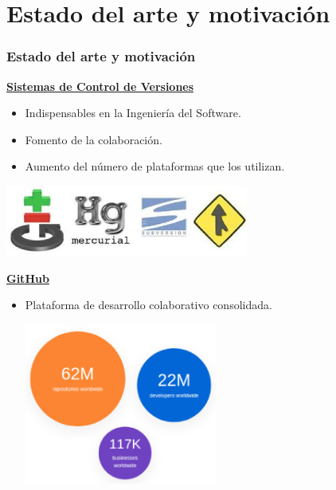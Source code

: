 \documentclass{beamer}
\begin{document}
\section{Estado del arte y motivación}
\begin{frame}[allowframebreaks]
	\frametitle{Estado del arte y motivación}
	
	\underline{{\bfseries Sistemas de Control de Versiones}}
	\bigskip
	
	\begin{itemize}
       \item Indispensables en la Ingeniería del Software.
	   \item Fomento de la colaboración.	
	   \item Aumento del número de plataformas que los utilizan.  
	\end{itemize}
	\bigskip
	
	\begin{center}
		\includegraphics[width=0.6\textwidth]{images/control-versiones2.eps}
	\end{center}
	
	\framebreak

	\vspace*{0.18cm}	
	\underline{{\bfseries GitHub}}

	\begin{itemize}
       \item Plataforma de desarrollo colaborativo consolidada.
       \begin{center}
	       \includegraphics[width=0.5\textwidth]{images/github-stats.eps}
	   \end{center}
       \framebreak
       

\end{itemize}
\end{frame}
\end{document}
